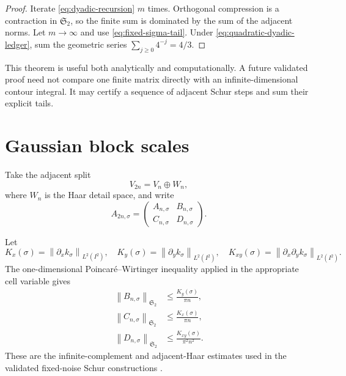 \documentclass[11pt]{article}
\theoremstyle{definition}
\theoremstyle{remark}
\newcommand{\HS}{\mathfrak S_2}
\newcommand{\norm}[1]{\left\lVert #1\right\rVert}
\begin{document}
\begin{proof}
Iterate \eqref{eq:dyadic-recursion} $m$ times.  Orthogonal compression is a
contraction in $\HS$, so the finite sum is dominated by the sum of the
adjacent norms.  Let $m\to\infty$ and use
\eqref{eq:fixed-sigma-tail}.  Under
\eqref{eq:quadratic-dyadic-ledger}, sum the geometric series
$\sum_{j\ge0}4^{-j}=4/3$.
\end{proof}

This theorem is useful both analytically and computationally.  A future
validated proof need not compare one finite matrix directly with an
infinite-dimensional contour integral.  It may certify a sequence of
adjacent Schur steps and sum their explicit tails.

\section{Gaussian block scales}
\label{sec:block-scales}

Take the adjacent split
\begin{equation}
 V_{2n}=V_n\oplus W_n,
 \label{eq:haar-split}
\end{equation}
where $W_n$ is the Haar detail space, and write
\begin{equation}
 A_{2n,\sigma}
 =\begin{pmatrix}
 A_{n,\sigma}&B_{n,\sigma}\\
 C_{n,\sigma}&D_{n,\sigma}
 \end{pmatrix}.
 \label{eq:adjacent-blocks}
\end{equation}

Let
\begin{equation}
 K_x(\sigma)=\norm{\partial_xk_\sigma}_{L^2(I^2)},
 \quad
 K_y(\sigma)=\norm{\partial_yk_\sigma}_{L^2(I^2)},
 \quad
 K_{xy}(\sigma)=\norm{\partial_x\partial_yk_\sigma}_{L^2(I^2)}.
 \label{eq:derivative-envelopes}
\end{equation}
The one-dimensional Poincar\'e--Wirtinger inequality applied in the
appropriate cell variable gives
\begin{align}
 \norm{B_{n,\sigma}}_{\HS}
 &\le\frac{K_y(\sigma)}{\pi n},
 \label{eq:B-bound}\\
 \norm{C_{n,\sigma}}_{\HS}
 &\le\frac{K_x(\sigma)}{\pi n},
 \label{eq:C-bound}\\
 \norm{D_{n,\sigma}}_{\HS}
 &\le\frac{K_{xy}(\sigma)}{\pi^2n^2}.
 \label{eq:D-bound}
\end{align}
These are the infinite-complement and adjacent-Haar estimates used in the
validated fixed-noise Schur constructions
\citep{WangWeightedKernel2026,WangRankTwo2026}.
\end{document}
